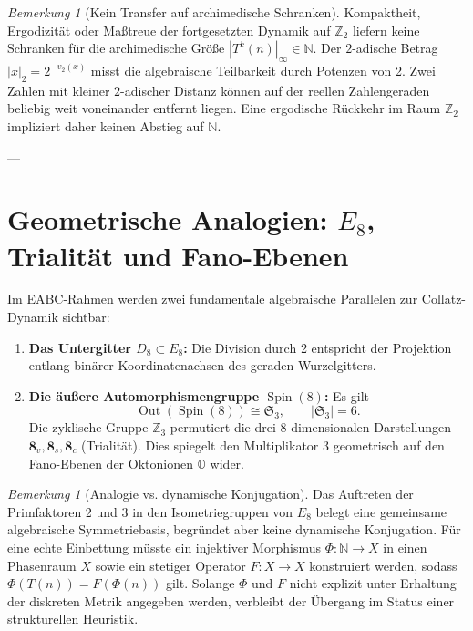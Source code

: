 \documentclass[11pt,reqno]{amsart}
\theoremstyle{definition}
\theoremstyle{remark}
\newtheorem{remark}[theorem]{Bemerkung}
\numberwithin{equation}{section}
\begin{document}
\begin{remark}[Kein Transfer auf archimedische Schranken]
Kompaktheit, Ergodizität oder Maßtreue der fortgesetzten Dynamik auf $\mathbb{Z}_2$ liefern keine Schranken für die archimedische Größe $|T^k(n)|_{\infty} \in \mathbb{N}$. 
Der $2$-adische Betrag $|x|_2 = 2^{-v_2(x)}$ misst die algebraische Teilbarkeit durch Potenzen von 2. Zwei Zahlen mit kleiner $2$-adischer Distanz können auf der reellen Zahlengeraden beliebig weit voneinander entfernt liegen. Eine ergodische Rückkehr im Raum $\mathbb{Z}_2$ impliziert daher keinen Abstieg auf $\mathbb{N}$.
\end{remark}

---

\section{Geometrische Analogien: $E_8$, Trialität und Fano-Ebenen}

Im EABC-Rahmen werden zwei fundamentale algebraische Parallelen zur Collatz-Dynamik sichtbar:
\begin{enumerate}
\item \textbf{Das Untergitter $D_8 \subset E_8$:} Die Division durch 2 entspricht der Projektion entlang binärer Koordinatenachsen des geraden Wurzelgitters.
\item \textbf{Die äußere Automorphismengruppe $\operatorname{Spin}(8)$:} Es gilt
\begin{equation}
\operatorname{Out}(\operatorname{Spin}(8)) \cong \mathfrak{S}_3, \qquad |\mathfrak{S}_3| = 6.
\end{equation}
Die zyklische Gruppe $\mathbb{Z}_3$ permutiert die drei 8-dimensionalen Darstellungen $\mathbf{8}_v, \mathbf{8}_s, \mathbf{8}_c$ (Trialität). Dies spiegelt den Multiplikator $3$ geometrisch auf den Fano-Ebenen der Oktonionen $\mathbb{O}$ wider.
\end{enumerate}

\begin{remark}[Analogie vs. dynamische Konjugation]
Das Auftreten der Primfaktoren 2 und 3 in den Isometriegruppen von $E_8$ belegt eine gemeinsame algebraische Symmetriebasis, begründet aber keine dynamische Konjugation. 
Für eine echte Einbettung müsste ein injektiver Morphismus $\Phi: \mathbb{N} \to X$ in einen Phasenraum $X$ sowie ein stetiger Operator $F: X \to X$ konstruiert werden, sodass $\Phi(T(n)) = F(\Phi(n))$ gilt. Solange $\Phi$ und $F$ nicht explizit unter Erhaltung der diskreten Metrik angegeben werden, verbleibt der Übergang im Status einer strukturellen Heuristik.
\end{remark}
\end{document}
